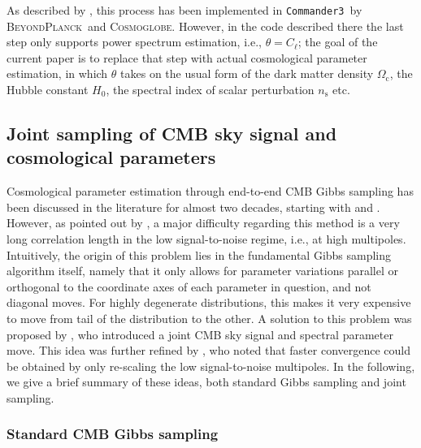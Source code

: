 \documentclass[twocolumn]{../common/aa}
\def\commanderthree{\texttt{Commander3}}
\newcommand{\BP}{\textsc{BeyondPlanck}}
\newcommand{\Cosmoglobe}{\textsc{Cosmoglobe}}
\begin{document}
As described by \citet{bp01,watts2023_dr1}, this process has been implemented in \commanderthree\ by \BP\ and \Cosmoglobe. However, in the code described there the last step only supports power spectrum estimation, i.e., $\theta = C_{\ell}$; the goal of the current paper is to replace that step with actual cosmological parameter estimation, in which $\theta$ takes on the usual form of the dark matter density $\Omega_\mathrm{c}$, the Hubble constant $H_0$, the spectral index of scalar perturbation $n_\mathrm{s}$ etc.

\subsection{Joint sampling of CMB sky signal and cosmological parameters}

Cosmological parameter estimation through end-to-end CMB Gibbs sampling has been discussed in the literature for almost two decades, starting with \citet{jewell2004} and \citet{wandelt2004}. However, as pointed out by \citet{eriksen:2004}, a major difficulty regarding this method is a very long correlation length in the low signal-to-noise regime, i.e., at high multipoles. Intuitively, the origin of this problem lies in the fundamental Gibbs sampling algorithm itself, namely that it only allows for parameter variations parallel or orthogonal to the coordinate axes of each parameter in question, and not diagonal moves. For highly degenerate distributions, this makes it very expensive to move from tail of the distribution to the other. A solution to this problem was proposed by \citet{jewell:2009}, who introduced a joint CMB sky signal and spectral parameter move. This idea was further refined by \citet{racine:2016}, who noted that faster convergence could be obtained by only re-scaling the low signal-to-noise multipoles. In the following, we give a brief summary of these ideas, both standard Gibbs sampling and joint sampling.

\subsubsection{Standard CMB Gibbs sampling}
\label{sec:gibbs}
\end{document}
